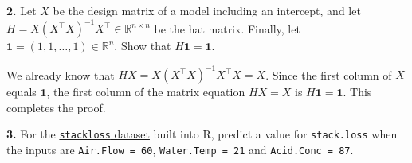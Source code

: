 \documentclass[
  a4paper,
]{article}
\theoremstyle{definition}
\theoremstyle{definition}
\theoremstyle{definition}
\theoremstyle{definition}
\theoremstyle{remark}
\begin{document}
\textbf{2.} Let \(X\) be the design matrix of a model including an intercept, and
let \(H = X (X^\top X)^{-1} X^\top \in\mathbb{R}^{n\times n}\) be the hat matrix.
Finally, let \(\mathbf{1} = (1, 1, \ldots, 1) \in\mathbb{R}^n\).
Show that \(H \mathbf{1} = \mathbf{1}\).

\begin{myanswers}
We already know that \(H X = X (X^\top X)^{-1} X^\top X = X\). Since
the first column of \(X\) equals \(\mathbf{1}\), the first column of
the matrix equation \(HX = X\) is \(H\mathbf{1} = \mathbf{1}\). This
completes the proof.

\end{myanswers}

\textbf{3.} For the \href{https://rdrr.io/r/datasets/stackloss.html}{\texttt{stackloss} dataset}
built into R, predict a value for \texttt{stack.loss} when the inputs are
\texttt{Air.Flow\ =\ 60}, \texttt{Water.Temp\ =\ 21} and \texttt{Acid.Conc\ =\ 87}.
\end{document}
